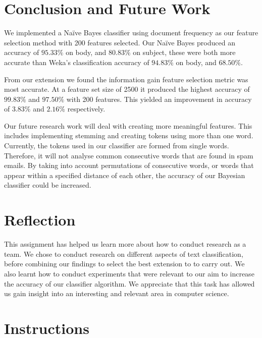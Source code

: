 \documentclass[10pt, a4paper]{article}
\begin{document}
\section{Conclusion and Future Work}


We implemented a Na\"ive Bayes classifier using document frequency as our feature selection method with 200 features selected. Our Na\"ive Bayes produced an accuracy of $95.33\%$ on body, and $80.83\%$ on subject, these were both more accurate than Weka's classification accuracy of $94.83\%$ on body, and $68.50\%$.

From our extension we found the information gain feature selection metric was most accurate. At a feature set size of 2500 it produced the highest accuracy of $99.83\%$ and $97.50\%$ with 200 features. This yielded an improvement in accuracy of $3.83\%$ and $2.16\%$ respectively.

Our future research work will deal with creating more meaningful features. This includes implementing stemming and creating tokens using more than one word. Currently, the tokens used in our classifier are formed from single words. Therefore, it will not analyse common consecutive words that are found in spam emails. By taking into account permutations of consecutive words, or words that appear within a specified distance of each other, the accuracy of our Bayesian classifier could be increased.

\section{Reflection}

This assignment has helped us learn more about how to conduct research as a team. We chose to conduct research on different aspects of text classification, before combining our findings to select the best extension to to carry out. We also learnt how to conduct experiments that were relevant to our aim to increase the accuracy of our classifier algorithm. We appreciate that this task has allowed us gain insight into an interesting and relevant area in computer science.

\section{Instructions}
\end{document}

